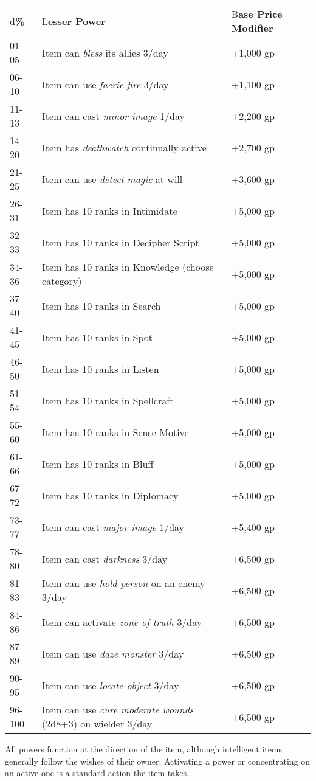 \documentclass{article}
\begin{document}
\begin{tabular}{|>{\raggedright}p{31pt}|>{\raggedright}p{236pt}|>{\raggedright}p{46pt}|}
\hline
\multicolumn{3}{|p{314pt}|}{I\textbf{ntelligent Item Lesser Powers}}\tabularnewline
\hline
d\textbf{\%} & L\textbf{esser Power} & B\textbf{ase Price}\linebreak{}
\textbf{Modifier}\tabularnewline
\hline
01-05 & Item can \textit{bless }its allies 3/day & +1,000 gp\tabularnewline
\hline
06-10 & Item can use \textit{faerie fire }3/day  & +1,100 gp\tabularnewline
\hline
11-13 & Item can cast \textit{minor image }1/day & +2,200 gp\tabularnewline
\hline
14-20 & Item has \textit{deathwatch }continually active & +2,700 gp\tabularnewline
\hline
21-25 & Item can use \textit{detect magic }at will & +3,600 gp\tabularnewline
\hline
26-31 & Item has 10 ranks in Intimidate & +5,000 gp\tabularnewline
\hline
32-33 & Item has 10 ranks in Decipher Script & +5,000 gp\tabularnewline
\hline
34-36 & Item has 10 ranks in Knowledge (choose category) & +5,000 gp\tabularnewline
\hline
37-40 & Item has 10 ranks in Search & +5,000 gp\tabularnewline
\hline
41-45 & Item has 10 ranks in Spot & +5,000 gp\tabularnewline
\hline
46-50 & Item has 10 ranks in Listen & +5,000 gp\tabularnewline
\hline
51-54 & Item has 10 ranks in Spellcraft & +5,000 gp\tabularnewline
\hline
55-60 & Item has 10 ranks in Sense Motive & +5,000 gp\tabularnewline
\hline
61-66 & Item has 10 ranks in Bluff & +5,000 gp\tabularnewline
\hline
67-72 & Item has 10 ranks in Diplomacy & +5,000 gp\tabularnewline
\hline
73-77 & Item can cast \textit{major image }1/day & +5,400 gp\tabularnewline
\hline
78-80 & Item can cast \textit{darkness }3/day & +6,500 gp\tabularnewline
\hline
81-83 & Item can use \textit{hold person }on an enemy 3/day & +6,500 gp\tabularnewline
\hline
84-86 & Item can activate \textit{zone of truth }3/day & +6,500 gp\tabularnewline
\hline
87-89 & Item can use \textit{daze monster }3/day & +6,500 gp\tabularnewline
\hline
90-95 & Item can use \textit{locate object }3/day & +6,500 gp\tabularnewline
\hline
96-100 & Item can use \textit{cure moderate wounds }(2d8+3) on wielder 3/day & +6,500 
gp\tabularnewline
\hline
\end{tabular}

All powers function at the direction of the item, although intelligent items generally 
follow the wishes of their owner. Activating a power or concentrating on an active 
one is a standard action the item takes.
\end{document}
